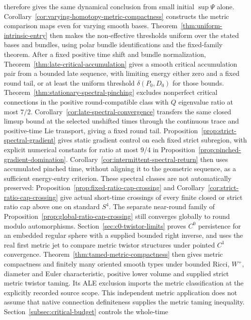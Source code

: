 \documentclass[11pt]{article}
\numberwithin{equation}{section}
\theoremstyle{definition}
\theoremstyle{remark}
\begin{document}
therefore gives the same dynamical conclusion from small
initial $\sup\Psi$ alone. Corollary~\ref{cor:varying-homotopy-metric-compactness}
constructs the metric comparison maps even for varying smooth bases.
Theorem~\ref{thm:uniform-intrinsic-entry} then makes the
non-effective thresholds uniform over the stated bases and bundles,
using polar bundle identifications and the fixed-family theorem.
After a fixed positive time shift and bundle normalization,
Theorem~\ref{thm:late-critical-accumulation} gives a smooth
critical accumulation pair from a bounded late sequence, with
limiting energy either zero and a fixed round tail, or at least
the uniform threshold $\delta(P_0,D_0)$ for those bounds.
Theorem~\ref{thm:stationary-spectral-pinching} excludes nonperfect
critical connections in the positive round-compatible class
with $Q$ eigenvalue ratio at most $7/2$.
Corollary~\ref{cor:late-spectral-convergence} transfers the same
closed limsup bound at the selected unshifted times through the
continuous trace and positive-time Lie transport, giving a fixed
round tail. Proposition~\ref{prop:strict-spectral-gradient}
gives static gradient control on each fixed strict subregion,
with explicit numerical constants for ratio at most $9/4$ in
Proposition~\ref{prop:pinched-gradient-domination}.
Corollary~\ref{cor:intermittent-spectral-return} then uses
accumulated pinched time, without aligning it to the geometric
sequence, as a sufficient energy-entry criterion.
These spectral classes are not automatically preserved:
Proposition~\ref{prop:fixed-ratio-cap-crossing} and
Corollary~\ref{cor:strict-ratio-cap-crossing} give actual
short-time crossings of every finite closed or strict ratio
cap above one on standard $S^4$. The separate near-round
family of Proposition~\ref{prop:global-ratio-cap-crossing}
still converges globally to round modulo automorphisms.
Section~\ref{sec:c0-twistor-limits}
proves $C^0$ persistence for an embedded regular sphere with
a supplied bounded right inverse, and uses the real first metric jet to compare metric twistor
structures under pointed $C^1$ convergence.
Theorem~\ref{thm:tamed-metric-compactness} then gives metric
compactness and finitely many oriented smooth types under
bounded Ricci, $W^+$, diameter and Euler characteristic,
positive lower volume and supplied strict metric twistor taming.
Its ALE exclusion imports the metric classification at the
explicitly recorded source scope. This independent metric
application does not assume that native connection definiteness
supplies the metric taming inequality.
Section~\ref{subsec:critical-budget} controls the whole-time
\end{document}
